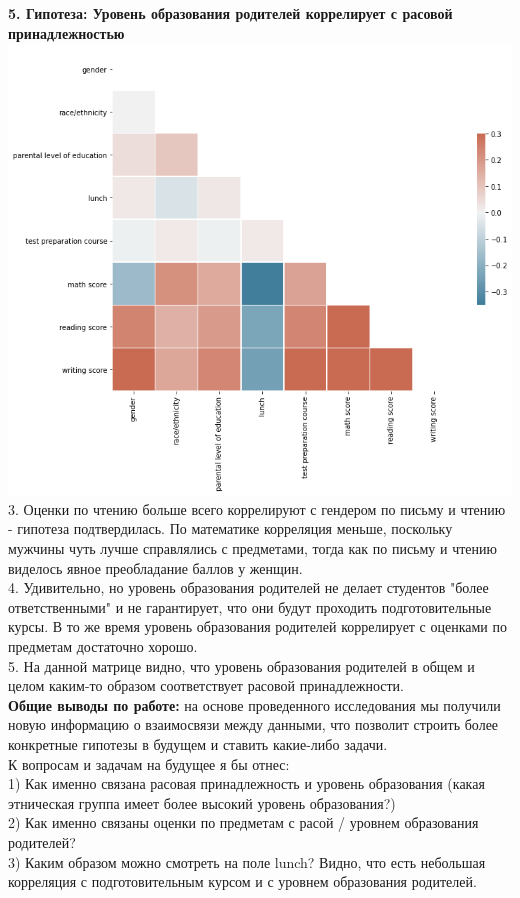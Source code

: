 \documentclass[12pt,a4paper]{article}
\begin{document}
\textbf{5. Гипотеза: Уровень образования родителей коррелирует с расовой принадлежностью}\\


\includegraphics[scale=0.6]{matrix_corr} \\

3. Оценки по чтению больше всего коррелируют с гендером по письму и чтению - гипотеза подтвердилась. По математике корреляция меньше, поскольку мужчины чуть лучше справлялись с предметами, тогда как по письму и чтению виделось явное преобладание баллов у женщин.\\

4. Удивительно, но уровень образования родителей не делает студентов "более ответственными" и не гарантирует, что они будут проходить подготовительные курсы. В то же время уровень образования родителей коррелирует с оценками по предметам достаточно хорошо.\\

5. На данной матрице видно, что уровень образования родителей в общем и целом каким-то образом соответствует расовой принадлежности.\\

\textbf{Общие выводы по работе:} на основе проведенного исследования мы получили новую информацию о взаимосвязи между данными, что позволит строить более конкретные гипотезы в будущем и ставить какие-либо задачи.\\

К вопросам и задачам на будущее я бы отнес:\\
1) Как именно связана расовая принадлежность и уровень образования (какая этническая группа имеет более высокий уровень образования?)\\

2) Как именно связаны оценки по предметам с расой / уровнем образования родителей? \\

3) Каким образом можно смотреть на поле lunch? Видно, что есть небольшая корреляция с подготовительным курсом и с уровнем образования родителей. \\
\end{document}

